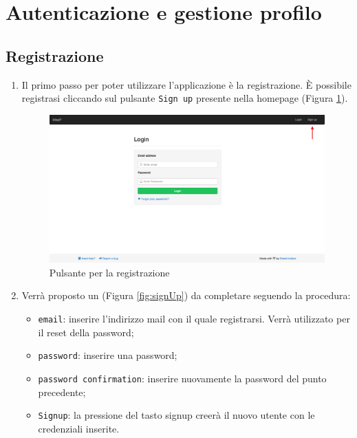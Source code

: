 \clearpage
\section{Autenticazione e gestione profilo}

	\subsection{Registrazione}
		\label{registrazione}

		\begin{enumerate}

			\item Il primo passo per poter utilizzare l'applicazione  è la registrazione. \`E possibile registrasi cliccando sul pulsante \texttt{Sign up} presente nella homepage (Figura \ref{fig:signUpButton}).

			\begin{figure}[H]
				\centering \includegraphics[width=1\textwidth]{img/pulsanteSignUp.png}
			\caption{ \label{fig:signUpButton} Pulsante per la registrazione}
			\end{figure}

			\item Verrà proposto un  (Figura \ref{fig:signUp}) da completare seguendo la procedura:
				\begin{itemize}
					\item \texttt{email}: inserire l'indirizzo mail con il quale registrarsi. Verrà utilizzato per il reset della password;
					\item \texttt{password}: inserire una password;
					\item \texttt{password confirmation}: inserire nuovamente la password del punto precedente;
					\item \texttt{Signup}: la pressione del tasto signup creerà il nuovo utente con le credenziali inserite.
				\end{itemize}



\end{enumerate}
